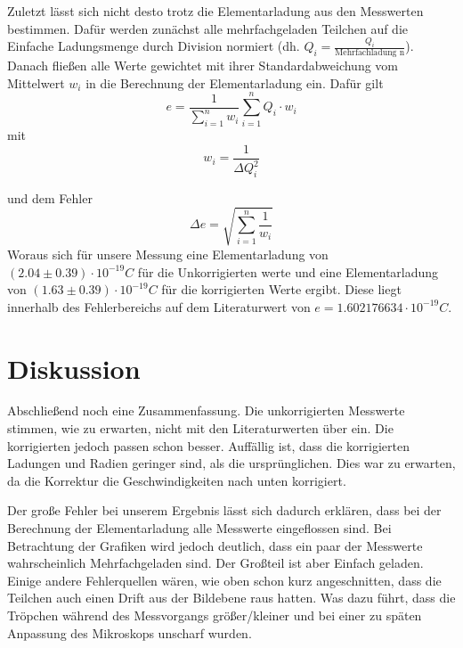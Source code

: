\documentclass{scrartcl}
\begin{document}
            Zuletzt lässt sich nicht desto trotz die Elementarladung aus den Messwerten bestimmen. Dafür werden zunächst
            alle mehrfachgeladen Teilchen auf die Einfache Ladungsmenge durch Division normiert (dh. $Q_i = \frac{Q_i}{\text{Mehrfachladung n}}$).
            Danach fließen alle Werte gewichtet mit ihrer Standardabweichung vom Mittelwert $w_i$ in die Berechnung der
            Elementarladung ein. Dafür gilt
            \begin{equation}
                e = \frac{1}{\sum_{i=1}^n w_i} \sum_{i=1}^n Q_i \cdot w_i 
            \end{equation}
            mit 
            \begin{equation}
                w_i = \frac{1}{\Delta Q_i^2}
            \end{equation}

            und dem Fehler
            \begin{equation}
                \Delta e = \sqrt{\sum_{i=1}^n\frac{1}{w_i}}
            \end{equation}
            Woraus sich für unsere Messung eine Elementarladung von $(2.04\pm 0.39)\cdot 10^{-19} C$ für die Unkorrigierten werte und eine
            Elementarladung von $(1.63\pm 0.39)\cdot 10^{-19}C$ für die korrigierten Werte ergibt.
            Diese liegt innerhalb des Fehlerbereichs auf dem Literaturwert von $e=1.602176634\cdot 10^{-19}C$.
            \section{Diskussion}
                Abschließend noch eine Zusammenfassung. Die unkorrigierten Messwerte stimmen, wie zu erwarten, 
                nicht mit den Literaturwerten über ein. Die korrigierten jedoch passen schon besser. 
                Auffällig ist, dass die korrigierten Ladungen und Radien geringer sind, als die ursprünglichen. 
                Dies war zu erwarten, da die Korrektur die Geschwindigkeiten nach unten korrigiert. 
            
                Der große Fehler bei unserem Ergebnis lässt sich dadurch erklären, dass bei der Berechnung
                der Elementarladung alle Messwerte eingeflossen sind. Bei Betrachtung der Grafiken wird jedoch deutlich,
                dass ein paar der Messwerte wahrscheinlich Mehrfachgeladen sind. Der Großteil ist aber Einfach geladen.
                Einige andere Fehlerquellen wären, wie oben schon kurz angeschnitten, dass die Teilchen auch einen Drift 
                aus der Bildebene raus hatten. Was dazu führt, dass die Tröpchen während des Messvorgangs größer/kleiner und
                bei einer zu späten Anpassung des Mikroskops unscharf wurden.
            
\end{document}
